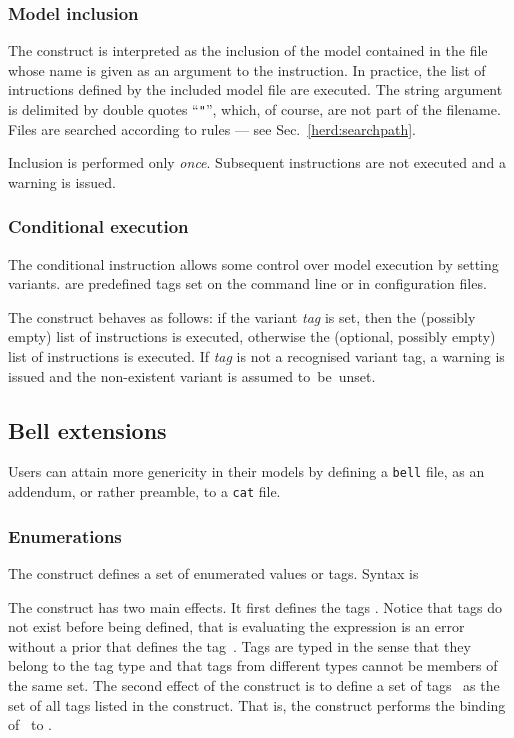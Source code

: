 \subsubsection*{Model inclusion}
The construct  is interpreted as
the inclusion of the model contained in the file whose name is given as
an argument to the  instruction.
In practice, the list of intructions defined by the included model file
are executed.
The string argument is delimited by double quotes ``\verb+"+'',
which, of course, are not part of the filename.
Files are searched according to \herd{} rules --- see Sec.~\ref{herd:searchpath}.

Inclusion is performed only \emph{once}. Subsequent  instructions
are not executed and a warning is issued.

\subsubsection*{Conditional execution}
The conditional instruction allows some control over model execution by setting variants.
 are predefined tags set on the
command line or in configuration files.

The
construct 
behaves as follows: if the variant \textit{tag} is set, then the
(possibly empty) list of instructions  is
executed, otherwise the (optional, possibly empty) list of
instructions  is executed. If \textit{tag}
is not a recognised variant tag, a warning is issued and the
non-existent variant is assumed to~be~unset.


\subsection*{Bell extensions}

Users can attain more genericity in their models by defining a {\tt bell} file,
as an addendum, or rather preamble, to a {\tt cat} file.

\subsubsection*{\label{sec:enum}Enumerations}
The  construct defines a set of enumerated values or tags. Syntax is
\begin{center}
\end{center}
The construct has two main effects.
It first defines the tags .
Notice that tags do not exist before being defined, that is
evaluating the expression  is an error without a prior
 that defines the tag~. Tags are typed in the sense
that they belong to the tag type  and that tags from
different types cannot be members of the same set.
The second effect of the construct is to define a set of tags~
as the set of all tags listed in the construct.
That is, the  construct performs the binding of~
to .

